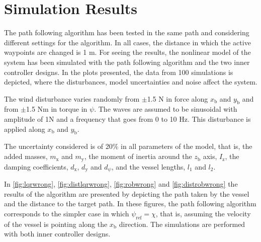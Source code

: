 \section{Simulation Results}
The path following algorithm has been tested in the same path and considering different settings for the algorithm. In all cases, the distance in which the active waypoints are changed is \num{1} m. For seeing the results, the nonlinear model of the system has been simulated with the path following algorithm and the two inner controller designs. In the plots presented, the data from 100 simulations is depicted, where the disturbances, model uncertainties and noise affect the system.

The wind disturbance varies randomly from $\pm$\num{1.5} N in force along $x_\mathrm{b}$ and $y_\mathrm{b}$ and from $\pm$\num{1.5} Nm in torque in $\psi$. The waves are assumed to be sinusoidal with amplitude of 1N and a frequency that goes from 0 to 10 Hz. This disturbance is applied along $x_\mathrm{b}$ and $y_\mathrm{b}$. 

The uncertainty considered is of 20\% in all parameters of the model, that is, the added masses, $m_\mathrm{x}$ and $m_\mathrm{y}$, the moment of inertia around the $z_\mathrm{b}$ axis, $I_\mathrm{z}$, the damping coefficients, $d_\mathrm{x}$, $d_\mathrm{y}$ and $d_\psi$, and the vessel lengths, $l_1$ and $l_2$.  

In \autoref{fig:lqrwrong}, \ref{fig:distlqrwrong}, \ref{fig:robwrong} and \ref{fig:distrobwrong} the results of the algorithm are presented by depicting the path taken by the vessel and the distance to the target path. In these figures, the path following algorithm corresponds to the simpler case in which $\psi_\mathrm{ref} = \chi$, that is, assuming the velocity of the vessel is pointing along the $x_\mathrm{b}$ direction. The simulations are performed with both inner controller designs. 

